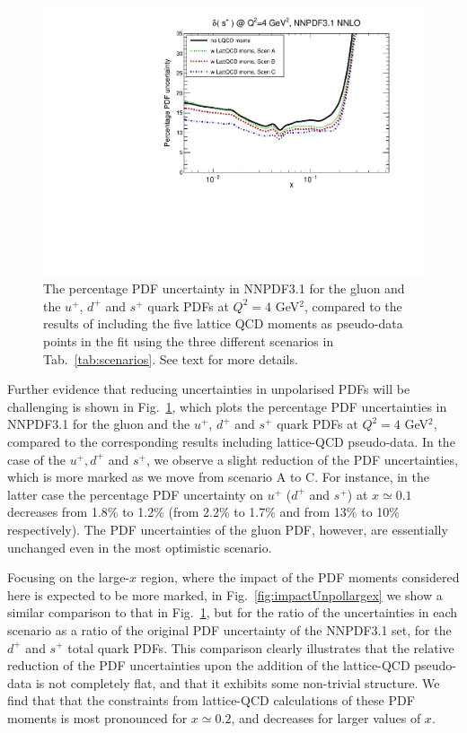 \begin{figure}[!t]
\includegraphics[scale=0.45]{plots/xsp-unpol-lattice-relerr.pdf}
\caption{\small The percentage PDF uncertainty in NNPDF3.1  
  for the gluon and the $u^+$, $d^+$ and $s^+$ quark PDFs at
  $Q^2=4$ GeV$^2$,
  compared to the results of including the five lattice
  QCD moments as pseudo-data points in the fit using the three
  different scenarios in  Tab.~\ref{tab:scenarios}.
See text for more details.
}    
\label{fig:impactUnpol}
\end{figure}

Further evidence that reducing uncertainties in unpolarised PDFs will be 
challenging is shown in Fig.~\ref{fig:impactUnpol}, which plots the percentage 
PDF uncertainties in NNPDF3.1 for the gluon and the
$u^+$, $d^+$ and $s^+$ quark PDFs at $Q^2=4$ GeV$^2$, compared to the 
corresponding results including lattice-QCD pseudo-data.
%
In the case of the $u^+,d^+$ and $s^+$, we observe a slight reduction
of the PDF uncertainties, which is more marked as we move
from scenario A to C.
%
For instance, in the latter case the percentage PDF
uncertainty on $u^+$ ($d^+$ and $s^+$) at $x\simeq 0.1$
decreases from 1.8\% to 1.2\% (from 2.2\% to 1.7\% and from 13\% to 10\% respectively).
%
The PDF uncertainties of the gluon PDF, however,
are essentially unchanged even in the most optimistic scenario.

Focusing on the large-$x$ region, where the
impact of the PDF moments considered here
is expected to be more marked, in
Fig.~\ref{fig:impactUnpollargex} we show a similar comparison
to that in Fig.~\ref{fig:impactUnpol}, but for the ratio 
of the uncertainties in each scenario as a ratio of the original PDF 
uncertainty of the NNPDF3.1 set, for the $d^+$
and $s^+$ total quark PDFs.
%
This comparison clearly illustrates that the relative reduction
of the PDF uncertainties upon the addition of the lattice-QCD
pseudo-data is not completely flat, and that it exhibits some
non-trivial structure.
%
We find that that the constraints from lattice-QCD calculations of these 
PDF moments is most pronounced for $x \simeq 0.2$, and decreases for larger 
values of $x$.


